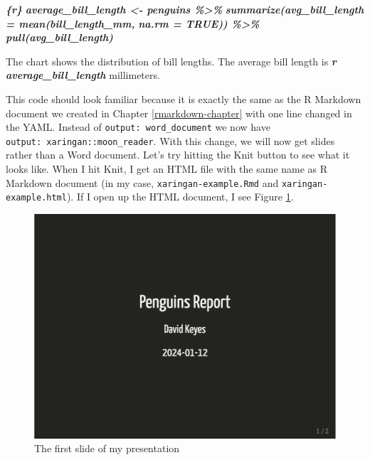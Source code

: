 \documentclass[
]{book}
\newenvironment{Shaded}{\begin{snugshade}}{\end{snugshade}}
\newcommand{\InformationTok}[1]{\textcolor[rgb]{0.56,0.35,0.01}{\textbf{\textit{#1}}}}
\newcommand{\NormalTok}[1]{#1}
\begin{document}
\begin{Shaded}
\begin{Highlighting}[]
\InformationTok{\textasciigrave{}\textasciigrave{}\textasciigrave{}\{r\}}
\InformationTok{average\_bill\_length \textless{}{-} penguins \%\textgreater{}\% }
\InformationTok{  summarize(avg\_bill\_length = mean(bill\_length\_mm,}
\InformationTok{                                   na.rm = TRUE)) \%\textgreater{}\% }
\InformationTok{  pull(avg\_bill\_length)}
\InformationTok{\textasciigrave{}\textasciigrave{}\textasciigrave{}}

\NormalTok{The chart shows the distribution of bill lengths. The average bill length is }\InformationTok{\textasciigrave{}r average\_bill\_length\textasciigrave{}}\NormalTok{ millimeters.}
\end{Highlighting}
\end{Shaded}

This code should look familiar because it is exactly the same as the R Markdown document we created in Chapter \ref{rmarkdown-chapter} with one line changed in the YAML. Instead of \texttt{output:\ word\_document} we now have \texttt{output:\ xaringan::moon\_reader}. With this change, we will now get slides rather than a Word document. Let's try hitting the Knit button to see what it looks like. When I hit Knit, I get an HTML file with the same name as R Markdown document (in my case, \texttt{xaringan-example.Rmd} and \texttt{xaringan-example.html}). If I open up the HTML document, I see Figure \ref{fig:penguins-report-slide-1}.

\begin{figure}
\includegraphics[width=1\linewidth]{assets/penguins-report-slide-1} \caption{The first slide of my presentation}\label{fig:penguins-report-slide-1}
\end{figure}
\end{document}
